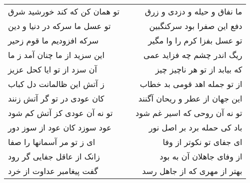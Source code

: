 \begin{center}
\begin{longtable}{l p{0.5cm} r}
\\
تو همان کن که کند خورشید شرق
&&
ما نفاق و حیله و دزدی و زرق
\\
تو عسل ما سرکه در دنیا و دین
&&
دفع این صفرا بود سرکنگبین
\\
سرکه افزودیم ما قوم زحیر
&&
تو عسل بفزا کرم را وا مگیر
\\
این سزید از ما چنان آمد ز ما
&&
ریگ اندر چشم چه فزاید عمی
\\
آن سزد از تو ایا کحل عزیز
&&
که بیابد از تو هر ناچیز چیز
\\
ز آتش این ظالمانت دل کباب
&&
از تو جمله اهد قومی بد خطاب
\\
کان عودی در تو گر آتش زنند
&&
این جهان از عطر و ریحان آگنند
\\
تو نه آن عودی کز آتش کم شود
&&
تو نه آن روحی که اسیر غم شود
\\
عود سوزد کان عود از سوز دور
&&
باد کی حمله برد بر اصل نور
\\
ای ز تو مر آسمانها را صفا
&&
ای جفای تو نکوتر از وفا
\\
زانک از عاقل جفایی گر رود
&&
از وفای جاهلان آن به بود
\\
گفت پیغامبر عداوت از خرد
&&
بهتر از مهری که از جاهل رسد
\\
\end{longtable}
\end{center}
